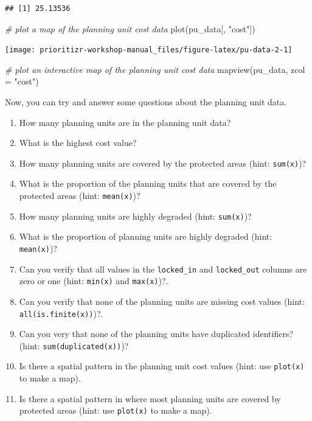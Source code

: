 \documentclass[
  12pt,
]{book}
\makeatletter
\newenvironment{Shaded}{\begin{snugshade}}{\end{snugshade}}
\newcommand{\AttributeTok}[1]{\textcolor[rgb]{0.77,0.63,0.00}{#1}}
\newcommand{\CommentTok}[1]{\textcolor[rgb]{0.56,0.35,0.01}{\textit{#1}}}
\newcommand{\FunctionTok}[1]{\textcolor[rgb]{0.00,0.00,0.00}{#1}}
\newcommand{\NormalTok}[1]{#1}
\newcommand{\StringTok}[1]{\textcolor[rgb]{0.31,0.60,0.02}{#1}}
\providecommand{\tightlist}{%
  \setlength{\itemsep}{0pt}\setlength{\parskip}{0pt}}
\newenvironment{kframe}{%
\medskip{}
\setlength{\fboxsep}{.8em}
 \def\at@end@of@kframe{}%
 \ifinner\ifhmode%
  \def\at@end@of@kframe{\end{minipage}}%
  \begin{minipage}{\columnwidth}%
 \fi\fi%
 \def\FrameCommand##1{\hskip\@totalleftmargin \hskip-\fboxsep
 \colorbox{shadecolor}{##1}\hskip-\fboxsep
     \hskip-\linewidth \hskip-\@totalleftmargin \hskip\columnwidth}%
 \MakeFramed {\advance\hsize-\width
   \@totalleftmargin\z@ \linewidth\hsize
   \@setminipage}}%
 {\par\unskip\endMakeFramed%
 \at@end@of@kframe}
\newenvironment{rmdblock}[1]
  {
  \begin{itemize}
  \renewcommand{\labelitemi}{
    \raisebox{-.7\height}[0pt][0pt]{
      {\setkeys{Gin}{width=3em,keepaspectratio}\texttt{[image: images/\#1]}}
    }
  }
  \setlength{\fboxsep}{1em}
  \begin{kframe}
  \item
  }
  {
  \end{kframe}
  \end{itemize}
  }
\newenvironment{rmdquestion}
  {\begin{rmdblock}{question}}
  {\end{rmdblock}}
\makeatother
\begin{document}
\begin{verbatim}
## [1] 25.13536
\end{verbatim}

\begin{Shaded}
\begin{Highlighting}[]
\CommentTok{\# plot a map of the planning unit cost data}
\FunctionTok{plot}\NormalTok{(pu\_data[, }\StringTok{"cost"}\NormalTok{])}
\end{Highlighting}
\end{Shaded}

\begin{center}\texttt{[image: prioritizr-workshop-manual\_files/figure-latex/pu-data-2-1]} \end{center}

\begin{Shaded}
\begin{Highlighting}[]
\CommentTok{\# plot an interactive map of the planning unit cost data}
\FunctionTok{mapview}\NormalTok{(pu\_data, }\AttributeTok{zcol =} \StringTok{"cost"}\NormalTok{)}
\end{Highlighting}
\end{Shaded}

Now, you can try and answer some questions about the planning unit data.

\begin{rmdquestion}
\begin{enumerate}
\def\labelenumi{\arabic{enumi}.}
\tightlist
\item
  How many planning units are in the planning unit data?
\item
  What is the highest cost value?
\item
  How many planning units are covered by the protected areas (hint: \texttt{sum(x)})?
\item
  What is the proportion of the planning units that are covered by the protected areas (hint: \texttt{mean(x)})?
\item
  How many planning units are highly degraded (hint: \texttt{sum(x)})?
\item
  What is the proportion of planning units are highly degraded (hint: \texttt{mean(x)})?
\item
  Can you verify that all values in the \texttt{locked\_in} and \texttt{locked\_out} columns are zero or one (hint: \texttt{min(x)} and \texttt{max(x)})?.
\item
  Can you verify that none of the planning units are missing cost values (hint: \texttt{all(is.finite(x))})?.
\item
  Can you very that none of the planning units have duplicated identifiers? (hint: \texttt{sum(duplicated(x))})?
\item
  Is there a spatial pattern in the planning unit cost values (hint: use \texttt{plot(x)} to make a map).
\item
  Is there a spatial pattern in where most planning units are covered by protected areas (hint: use \texttt{plot(x)} to make a map).
\end{enumerate}
\end{rmdquestion}
\end{document}
